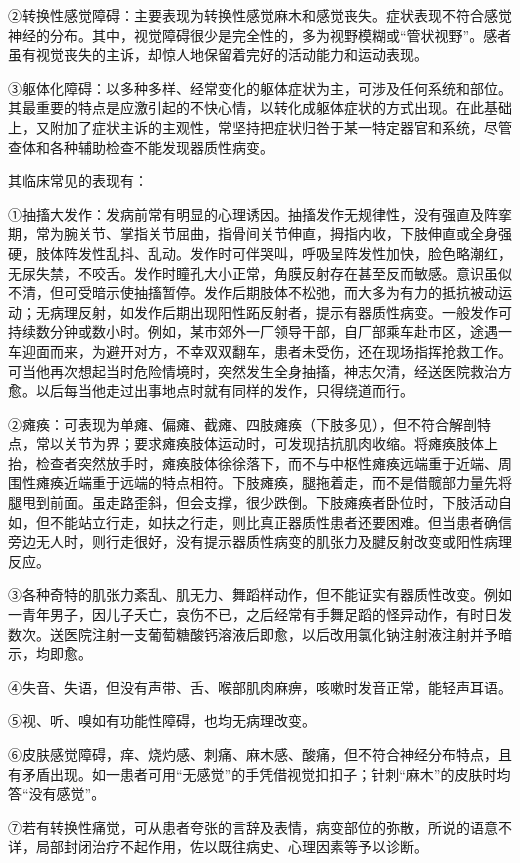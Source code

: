 ②转换性感觉障碍：主要表现为转换性感觉麻木和感觉丧失。症状表现不符合感觉神经的分布。其中，视觉障碍很少是完全性的，多为视野模糊或“管状视野”。感者虽有视觉丧失的主诉，却惊人地保留着完好的活动能力和运动表现。

③躯体化障碍：以多种多样、经常变化的躯体症状为主，可涉及任何系统和部位。其最重要的特点是应激引起的不快心情，以转化成躯体症状的方式出现。在此基础上，又附加了症状主诉的主观性，常坚持把症状归咎于某一特定器官和系统，尽管查体和各种辅助检查不能发现器质性病变。

其临床常见的表现有：

①抽搐大发作：发病前常有明显的心理诱因。抽搐发作无规律性，没有强直及阵挛期，常为腕关节、掌指关节屈曲，指骨间关节伸直，拇指内收，下肢伸直或全身强硬，肢体阵发性乱抖、乱动。发作时可伴哭叫，呼吸呈阵发性加快，脸色略潮红，无尿失禁，不咬舌。发作时瞳孔大小正常，角膜反射存在甚至反而敏感。意识虽似不清，但可受暗示使抽搐暂停。发作后期肢体不松弛，而大多为有力的抵抗被动运动；无病理反射，如发作后期出现阳性跖反射者，提示有器质性病变。一般发作可持续数分钟或数小时。例如，某市郊外一厂领导干部，自厂部乘车赴市区，途遇一车迎面而来，为避开对方，不幸双双翻车，患者未受伤，还在现场指挥抢救工作。可当他再次想起当时危险情境时，突然发生全身抽搐，神志欠清，经送医院救治方愈。以后每当他走过出事地点时就有同样的发作，只得绕道而行。

②瘫痪：可表现为单瘫、偏瘫、截瘫、四肢瘫痪（下肢多见），但不符合解剖特点，常以关节为界；要求瘫痪肢体运动时，可发现拮抗肌肉收缩。将瘫痪肢体上抬，检查者突然放手时，瘫痪肢体徐徐落下，而不与中枢性瘫痪远端重于近端、周围性瘫痪近端重于远端的特点相符。下肢瘫痪，腿拖着走，而不是借髋部力量先将腿甩到前面。虽走路歪斜，但会支撑，很少跌倒。下肢瘫痪者卧位时，下肢活动自如，但不能站立行走，如扶之行走，则比真正器质性患者还要困难。但当患者确信旁边无人时，则行走很好，没有提示器质性病变的肌张力及腱反射改变或阳性病理反应。

③各种奇特的肌张力紊乱、肌无力、舞蹈样动作，但不能证实有器质性改变。例如一青年男子，因儿子夭亡，哀伤不已，之后经常有手舞足蹈的怪异动作，有时日发数次。送医院注射一支葡萄糖酸钙溶液后即愈，以后改用氯化钠注射液注射并予暗示，均即愈。

④失音、失语，但没有声带、舌、喉部肌肉麻痹，咳嗽时发音正常，能轻声耳语。

⑤视、听、嗅如有功能性障碍，也均无病理改变。

⑥皮肤感觉障碍，痒、烧灼感、刺痛、麻木感、酸痛，但不符合神经分布特点，且有矛盾出现。如一患者可用“无感觉”的手凭借视觉扣扣子；针刺“麻木”的皮肤时均答“没有感觉”。

⑦若有转换性痛觉，可从患者夸张的言辞及表情，病变部位的弥散，所说的语意不详，局部封闭治疗不起作用，佐以既往病史、心理因素等予以诊断。

